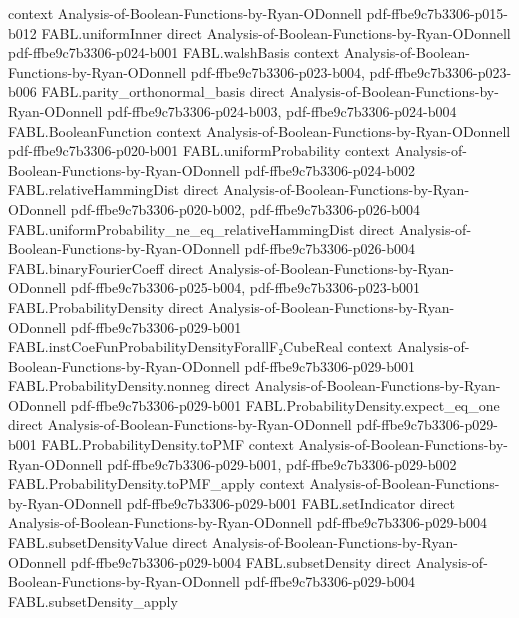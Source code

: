 \begin{theorem}
  {context}
  {Analysis-of-Boolean-Functions-by-Ryan-ODonnell}
  {pdf-ffbe9c7b3306-p015-b012}
\proofstep
  {FABL.uniformInner}
  {direct}
  {Analysis-of-Boolean-Functions-by-Ryan-ODonnell}
  {pdf-ffbe9c7b3306-p024-b001}
\proofstep
  {FABL.walshBasis}
  {context}
  {Analysis-of-Boolean-Functions-by-Ryan-ODonnell}
  {pdf-ffbe9c7b3306-p023-b004,
    pdf-ffbe9c7b3306-p023-b006}
\proofstep
  {FABL.parity_orthonormal_basis}
  {direct}
  {Analysis-of-Boolean-Functions-by-Ryan-ODonnell}
  {pdf-ffbe9c7b3306-p024-b003,
    pdf-ffbe9c7b3306-p024-b004}
\proofstep
  {FABL.BooleanFunction}
  {context}
  {Analysis-of-Boolean-Functions-by-Ryan-ODonnell}
  {pdf-ffbe9c7b3306-p020-b001}
\proofstep
  {FABL.uniformProbability}
  {context}
  {Analysis-of-Boolean-Functions-by-Ryan-ODonnell}
  {pdf-ffbe9c7b3306-p024-b002}
\proofstep
  {FABL.relativeHammingDist}
  {direct}
  {Analysis-of-Boolean-Functions-by-Ryan-ODonnell}
  {pdf-ffbe9c7b3306-p020-b002,
    pdf-ffbe9c7b3306-p026-b004}
\proofstep
  {FABL.uniformProbability_ne_eq_relativeHammingDist}
  {direct}
  {Analysis-of-Boolean-Functions-by-Ryan-ODonnell}
  {pdf-ffbe9c7b3306-p026-b004}
\proofstep
  {FABL.binaryFourierCoeff}
  {direct}
  {Analysis-of-Boolean-Functions-by-Ryan-ODonnell}
  {pdf-ffbe9c7b3306-p025-b004,
    pdf-ffbe9c7b3306-p023-b001}
\proofstep
  {FABL.ProbabilityDensity}
  {direct}
  {Analysis-of-Boolean-Functions-by-Ryan-ODonnell}
  {pdf-ffbe9c7b3306-p029-b001}
\proofstep
  {FABL.instCoeFunProbabilityDensityForallF₂CubeReal}
  {context}
  {Analysis-of-Boolean-Functions-by-Ryan-ODonnell}
  {pdf-ffbe9c7b3306-p029-b001}
\proofstep
  {FABL.ProbabilityDensity.nonneg}
  {direct}
  {Analysis-of-Boolean-Functions-by-Ryan-ODonnell}
  {pdf-ffbe9c7b3306-p029-b001}
\proofstep
  {FABL.ProbabilityDensity.expect_eq_one}
  {direct}
  {Analysis-of-Boolean-Functions-by-Ryan-ODonnell}
  {pdf-ffbe9c7b3306-p029-b001}
\proofstep
  {FABL.ProbabilityDensity.toPMF}
  {context}
  {Analysis-of-Boolean-Functions-by-Ryan-ODonnell}
  {pdf-ffbe9c7b3306-p029-b001,
    pdf-ffbe9c7b3306-p029-b002}
\proofstep
  {FABL.ProbabilityDensity.toPMF_apply}
  {context}
  {Analysis-of-Boolean-Functions-by-Ryan-ODonnell}
  {pdf-ffbe9c7b3306-p029-b001}
\proofstep
  {FABL.setIndicator}
  {direct}
  {Analysis-of-Boolean-Functions-by-Ryan-ODonnell}
  {pdf-ffbe9c7b3306-p029-b004}
\proofstep
  {FABL.subsetDensityValue}
  {direct}
  {Analysis-of-Boolean-Functions-by-Ryan-ODonnell}
  {pdf-ffbe9c7b3306-p029-b004}
\proofstep
  {FABL.subsetDensity}
  {direct}
  {Analysis-of-Boolean-Functions-by-Ryan-ODonnell}
  {pdf-ffbe9c7b3306-p029-b004}
\proofstep
  {FABL.subsetDensity_apply}

\end{theorem}
